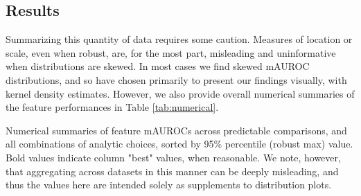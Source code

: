 \documentclass[12pt]{spieman}  %
\begin{document}
\begin{spacing}{2}
\section{Results}
\label{sec:results}

Summarizing this quantity of data requires some caution. Measures of location or
scale, even when robust, are, for the most part, misleading and uninformative
when distributions are skewed. In most cases we find skewed mAUROC
distributions, and so have chosen primarily to present our findings visually,
with kernel density estimates. However, we also provide overall numerical
summaries of the feature performances in Table \ref{tab:numerical}.

\begin{table}[h!]
\caption{Numerical summaries of feature mAUROCs across predictable comparisons,
and all combinations of analytic choices, sorted by 95\% percentile (robust
max) value. Bold values indicate column "best" values, when reasonable. We
note, however, that aggregating across datasets in this manner can be deeply
misleading\cite{brabecModelEvaluationNonconstant2020}, and thus the values here
are intended solely as supplements to distribution plots. }
\label{tab:numerical}
\small
\centering


\end{table}
\end{spacing}
\end{document}
